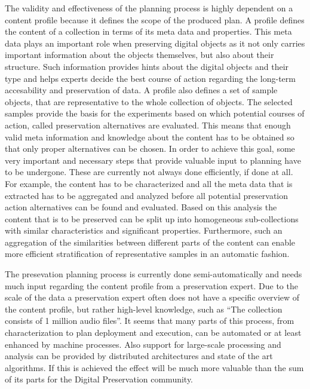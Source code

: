 The validity and effectiveness of the planning process is highly dependent on a content profile because it defines the scope of the produced plan. A profile defines the content of a collection in terms of its meta data and properties. This meta data plays an important role when preserving digital objects as it not only carries important information about the objects themselves, but also about their structure. Such information provides hints about the digital objects and their type and helps experts decide the best course of action regarding the long-term accesability and preservation of data. A profile also defines a set of sample objects, that are representative to the whole collection of objects. The selected samples provide the basis for the experiments based on which potential courses of action, called preservation alternatives are evaluated. This means that enough valid meta information and knowledge about the content has to be obtained so that only proper alternatives can be chosen. In order to achieve this goal, some very important and necessary steps that provide valuable input to planning have to be undergone. These are currently not always done efficiently, if done at all. For example, the content has to be characterized and all the meta data that is extracted has to be aggregated and analyzed before all potential preservation action alternatives can be found and evaluated. Based on this analysis the content that is to be preserved can be split up into homogeneous sub-collections with similar characteristics and significant properties. Furthermore, such an aggregation of the similarities between different parts of the content can enable more efficient stratification of representative samples in an automatic fashion.


The presevation planning process is currently done semi-automatically and needs much input regarding the content profile from a preservation expert. Due to the scale of the data a preservation expert often does not have a specific overview of the content profile, but rather high-level knowledge, such as ``The collection consists of 1 million audio files''. It seems that many parts of this process, from characterization to plan deployment and execution, can be automated or at least enhanced by machine processes. Also support for large-scale processing and analysis can be provided by distributed architectures and state of the art algorithms. If this is achieved the effect will be much more valuable than the sum of its parts for the Digital Preservation community.

